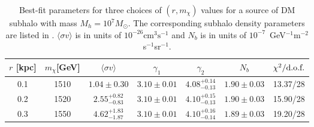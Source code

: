 \begin{table}[htbp]
	\centering
		\begin{tabular}{cc|cccc|c}
		\hline\hline
		  $r$ [kpc] & $m_\chi$[GeV] & $\langle \sigma v \rangle$  & $\gamma_1$ & $\gamma_2$ & $N_b$  & $\chi^2/\text{d.o.f.}$ \\
				 \hline
				 0.1& 1510 & $ 1.04\pm0.30$  & $3.10\pm0.01$ & $4.08^{+0.14}_{-0.13}$ & $1.90\pm0.03$ & 13.37/28\\
		0.2 &1520 & $2.55^{+0.82}_{-0.83}$ & $3.10\pm0.01$& $4.10^{+0.15}_{-0.13}$&  $1.90\pm0.03$ & 15.90/28\\
		0.3 &1550 & $4.62^{+1.83}_{-1.87}$ & $3.10\pm0.01$& $4.10^{+0.16}_{-0.14}$& $1.89\pm0.03$& 19.20/28\\
		  \hline\hline
		\end{tabular}
	\caption{
	Best-fit parameters for three choices of $(r, m_{\chi})$ values for a source of  DM subhalo 
	with mass $M_{h}=10^{7} M_{\odot}$. The corresponding subhalo density parameters are listed
	in .  
	$\langle \sigma v\rangle$ is in units of $10^{-26}\text{cm}^{3}\text{s}^{-1}$ and 
	$N_{b}$ is in units of $10^{-7}$~GeV$^{-1}$m$^{-2}$s$^{-1}$sr$^{-1}$.
	}
\label{tab:extendDM}
\end{table}



